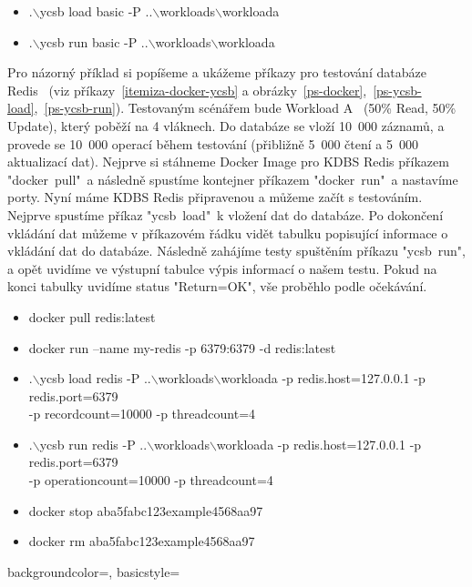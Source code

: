 \documentclass[czech,master,dept460,male,csharp,cpdeclaration]{diploma}
\begin{document}
	\begin{itemize}\label{itemize-demo}
		\item .$\backslash$ycsb load basic -P ..$\backslash$workloads$\backslash$workloada
		\item .$\backslash$ycsb run basic -P ..$\backslash$workloads$\backslash$workloada
	\end{itemize}
	
	Pro názorný příklad si popíšeme a ukážeme příkazy pro testování databáze Redis~\cite{redis} (viz příkazy~\ref{itemiza-docker-ycsb} a obrázky~\ref{ps-docker},~\ref{ps-ycsb-load},~\ref{ps-ycsb-run}). Testovaným scénářem bude Workload A~\cite{workloads} (50\% Read, 50\% Update), který poběží na 4 vláknech. Do databáze se vloží 10~000 záznamů, a provede se 10~000 operací během testování (přibližně 5~000 čtení a 5~000 aktualizací dat). Nejprve si stáhneme Docker Image pro KDBS Redis příkazem "docker~pull"~a následně spustíme kontejner příkazem "docker~run"~a nastavíme porty. Nyní máme KDBS Redis připravenou a můžeme začít s testováním. Nejprve spustíme příkaz "ycsb~load"~k vložení dat do databáze. Po dokončení vkládání dat můžeme v příkazovém řádku vidět tabulku popisující informace o vkládání dat do databáze. Následně zahájíme testy spuštěním příkazu "ycsb~run", a opět uvidíme ve výstupní tabulce výpis informací o našem testu. Pokud na konci tabulky uvidíme status "Return=OK", vše proběhlo podle očekávání.
	
	\begin{itemize}\label{itemiza-docker-ycsb}
		\item docker pull redis:latest
		\item docker run --name my-redis -p 6379:6379 -d redis:latest
		\item .$\backslash$ycsb load redis -P  ..$\backslash$workloads$\backslash$workloada -p redis.host=127.0.0.1 -p redis.port=6379 \\-p recordcount=10000 -p threadcount=4
		\item .$\backslash$ycsb run redis -P ..$\backslash$workloads$\backslash$workloada -p redis.host=127.0.0.1 -p redis.port=6379 \\-p operationcount=10000 -p threadcount=4
		\item docker stop aba5fabc123example4568aa97
		\item docker rm aba5fabc123example4568aa97
	\end{itemize}
	
	{
		backgroundcolor=\color[RGB]{1, 36, 86},
		basicstyle=\scriptsize\color{white}\ttfamily
	}
	
\end{document}
